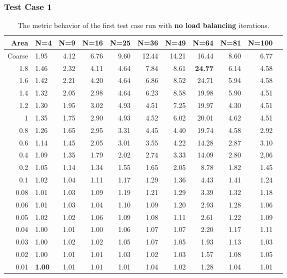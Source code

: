 \documentclass[]{beamer}
\begin{document}
\begin{frame}[t]\frametitle{Test Case 1}
\begin{table}[H]
\tiny
\centering
\caption{The metric behavior of the first test case run with \textbf{no load balancing} iterations.}
\begin{tabular}{rlrrrrrrrrr}
  \hline
 Area & N=4 & N=9 & N=16 & N=25 & N=36 & N=49 & N=64 & N=81 & N=100 \\ 
  \hline
 Coarse & 1.95 & 4.12 & 6.76 & 9.60 & 12.44 & 14.21 & 16.44 & 8.60 & 6.77 \\ 
   1.8 & 1.46 & 2.32 & 4.11 & 4.64 & 7.84 & 8.61 & \textbf{\cellcolor{blue!25}24.77} & 6.14 & 4.58 \\ 
 1.6 & 1.42 & 2.21 & 4.20 & 4.64 & 6.86 & 8.52 & 24.71 & 5.94 & 4.58 \\ 
 1.4 & 1.32 & 2.05 & 2.98 & 4.64 & 6.23 & 8.58 & 19.98 & 5.90 & 4.51 \\ 
 1.2 & 1.30 & 1.95 & 3.02 & 4.93 & 4.51 & 7.25 & 19.97 & 4.30 & 4.51 \\ 
  1 & 1.35 & 1.75 & 2.90 & 4.93 & 4.52 & 6.02 & 20.01 & 4.62 & 4.51 \\ 
  0.8 & 1.26 & 1.65 & 2.95 & 3.31 & 4.45 & 4.40 & 19.74 & 4.58 & 2.92 \\ 
   0.6 & 1.14 & 1.45 & 2.05 & 3.01 & 3.55 & 4.22 & 14.28 & 2.87 & 3.10 \\ 
 0.4 & 1.09 & 1.35 & 1.79 & 2.02 & 2.74 & 3.33 & 14.09 & 2.80 & 2.06 \\ 
   0.2 & 1.05 & 1.14 & 1.34 & 1.55 & 1.65 & 2.05 & 8.78 & 1.82 & 1.45 \\ 
  0.1 & 1.02 & 1.04 & 1.11 & 1.17 & 1.29 & 1.36 & 4.43 & 1.41 & 1.24 \\ 
  0.08 & 1.01 & 1.03 & 1.09 & 1.19 & 1.21 & 1.29 & 3.39 & 1.32 & 1.18 \\ 
 0.06 & 1.01 & 1.03 & 1.04 & 1.10 & 1.09 & 1.20 & 2.93 & 1.28 & 1.06 \\ 
  0.05 & 1.02 & 1.02 & 1.06 & 1.09 & 1.08 & 1.11 & 2.61 & 1.22 & 1.09 \\ 
   0.04 & 1.00 & 1.01 & 1.00 & 1.06 & 1.07 & 1.07 & 2.20 & 1.17 & 1.11 \\ 
  0.03 & 1.00 & 1.02 & 1.02 & 1.05 & 1.07 & 1.05 & 1.93 & 1.13 & 1.03 \\ 
   0.02 & 1.00 & 1.01 & 1.01 & 1.03 & 1.02 & 1.03 & 1.57 & 1.08 & 1.05 \\ 
  0.01 & \textbf{\cellcolor{blue!25}1.00} & 1.01 & 1.01 & 1.01 & 1.04 & 1.02 & 1.28 & 1.04 & 1.01 \\ 
   \hline
\end{tabular}
\end{table}
\end{frame}
\end{document}
